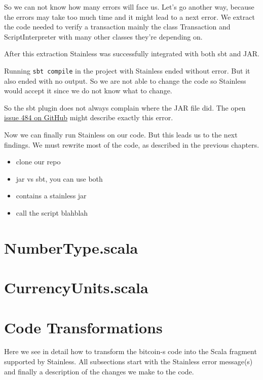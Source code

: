 \documentclass[runningheads]{llncs}
\begin{document}
So we can not know how many errors will face us.  Let's go another
way, because the errors may take too much time and it might lead to a
next error.  We extract the code needed to verify a transaction mainly
the class Transaction and ScriptInterpreter with many other classes
they're depending on.

After this extraction Stainless was successfully integrated with both
sbt and JAR.

Running \texttt{sbt compile} in the project with Stainless ended
without error.  But it also ended with no output.  So we are not able
to change the code so Stainless would accept it since we do not know
what to change.

So the sbt plugin does not always complain where the JAR file did.
The open
\href{https://github.com/epfl-lara/stainless/issues/484}{issue 484 on
  GitHub} might describe exactly this error.

Now we can finally run Stainless on our code.  But this leads us to
the next findings.  We must rewrite most of the code, as described in
the previous chapters.


\begin{itemize}
\item clone our repo
\item jar vs sbt, you can use both
\item contains a stainless jar
\item call the script blahblah
\end{itemize}


\section{NumberType.scala}


\section{CurrencyUnits.scala}



\section{Code Transformations} 

Here we see in detail how to transform the bitcoin-s code into the
Scala fragment supported by Stainless. All subsections start with the
Stainless error message(s) and finally a description of the changes we
make to the code.
\end{document}
